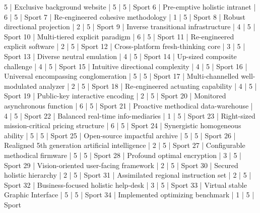 \begin{enumerate}
\begin{pseudo*}
       5 | Exclusive background website                     |        5 |      5 | Sport
       6 | Pre-emptive holistic intranet                    |        6 |      5 | Sport
       7 | Re-engineered cohesive methodology               |        1 |      5 | Sport
       8 | Robust directional projection                    |        2 |      5 | Sport
       9 | Inverse transitional infrastructure              |        4 |      5 | Sport
      10 | Multi-tiered explicit paradigm                   |        6 |      5 | Sport
      11 | Re-engineered explicit software                  |        2 |      5 | Sport
      12 | Cross-platform fresh-thinking core               |        3 |      5 | Sport
      13 | Diverse neutral emulation                        |        4 |      5 | Sport
      14 | Up-sized composite challenge                     |        4 |      5 | Sport
      15 | Intuitive directional complexity                 |        4 |      5 | Sport
      16 | Universal encompassing conglomeration            |        5 |      5 | Sport
      17 | Multi-channelled well-modulated analyzer         |        2 |      5 | Sport
      18 | Re-engineered actuating capability               |        4 |      5 | Sport
      19 | Public-key interactive encoding                  |        2 |      5 | Sport
      20 | Monitored asynchronous function                  |        6 |      5 | Sport
      21 | Proactive methodical data-warehouse              |        4 |      5 | Sport
      22 | Balanced real-time info-mediaries                |        1 |      5 | Sport
      23 | Right-sized mission-critical pricing structure   |        6 |      5 | Sport
      24 | Synergistic homogeneous ability                  |        5 |      5 | Sport
      25 | Open-source impactful archive                    |        5 |      5 | Sport
      26 | Realigned 5th generation artificial intelligence |        2 |      5 | Sport
      27 | Configurable methodical firmware                 |        5 |      5 | Sport
      28 | Profound optimal encryption                      |        3 |      5 | Sport
      29 | Vision-oriented user-facing framework            |        2 |      5 | Sport
      30 | Secured holistic hierarchy                       |        2 |      5 | Sport
      31 | Assimilated regional instruction set             |        2 |      5 | Sport
      32 | Business-focused holistic help-desk              |        3 |      5 | Sport
      33 | Virtual stable Graphic Interface                 |        5 |      5 | Sport
      34 | Implemented optimizing benchmark                 |        1 |      5 | Sport

\end{pseudo*}
\end{enumerate}
